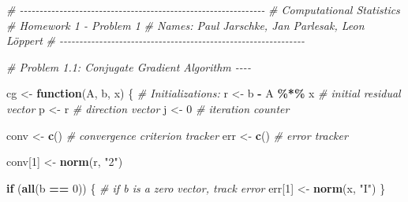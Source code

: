 \documentclass[
]{article}
\newenvironment{Shaded}{\begin{snugshade}}{\end{snugshade}}
\newcommand{\CommentTok}[1]{\textcolor[rgb]{0.56,0.35,0.01}{\textit{#1}}}
\newcommand{\ControlFlowTok}[1]{\textcolor[rgb]{0.13,0.29,0.53}{\textbf{#1}}}
\newcommand{\DecValTok}[1]{\textcolor[rgb]{0.00,0.00,0.81}{#1}}
\newcommand{\FunctionTok}[1]{\textcolor[rgb]{0.13,0.29,0.53}{\textbf{#1}}}
\newcommand{\NormalTok}[1]{#1}
\newcommand{\OtherTok}[1]{\textcolor[rgb]{0.56,0.35,0.01}{#1}}
\newcommand{\SpecialCharTok}[1]{\textcolor[rgb]{0.81,0.36,0.00}{\textbf{#1}}}
\newcommand{\StringTok}[1]{\textcolor[rgb]{0.31,0.60,0.02}{#1}}
\begin{document}
\begin{Shaded}
\begin{Highlighting}[]
\CommentTok{\# {-}{-}{-}{-}{-}{-}{-}{-}{-}{-}{-}{-}{-}{-}{-}{-}{-}{-}{-}{-}{-}{-}{-}{-}{-}{-}{-}{-}{-}{-}{-}{-}{-}{-}{-}{-}{-}{-}{-}{-}{-}{-}{-}{-}{-}{-}{-}{-}{-}{-}{-}{-}{-}{-}{-}{-}{-}{-}{-}{-}{-}{-}}
\CommentTok{\# Computational Statistics}
\CommentTok{\# Homework 1 {-} Problem 1}
\CommentTok{\# Names: Paul Jarschke, Jan Parlesak, Leon Löppert}
\CommentTok{\# {-}{-}{-}{-}{-}{-}{-}{-}{-}{-}{-}{-}{-}{-}{-}{-}{-}{-}{-}{-}{-}{-}{-}{-}{-}{-}{-}{-}{-}{-}{-}{-}{-}{-}{-}{-}{-}{-}{-}{-}{-}{-}{-}{-}{-}{-}{-}{-}{-}{-}{-}{-}{-}{-}{-}{-}{-}{-}{-}{-}{-}{-}}


\CommentTok{\# Problem 1.1: Conjugate Gradient Algorithm {-}{-}{-}{-}}

\NormalTok{cg }\OtherTok{\textless{}{-}} \ControlFlowTok{function}\NormalTok{(A, b, x) \{}
  \CommentTok{\# Initializations:}
\NormalTok{  r }\OtherTok{\textless{}{-}}\NormalTok{ b }\SpecialCharTok{{-}}\NormalTok{ A }\SpecialCharTok{\%*\%}\NormalTok{ x  }\CommentTok{\# initial residual vector}
\NormalTok{  p }\OtherTok{\textless{}{-}}\NormalTok{ r  }\CommentTok{\# direction vector}
\NormalTok{  j }\OtherTok{\textless{}{-}} \DecValTok{0}  \CommentTok{\# iteration counter}
  
\NormalTok{  conv }\OtherTok{\textless{}{-}} \FunctionTok{c}\NormalTok{()  }\CommentTok{\# convergence criterion tracker}
\NormalTok{  err }\OtherTok{\textless{}{-}} \FunctionTok{c}\NormalTok{()  }\CommentTok{\# error tracker}
  
\NormalTok{  conv[}\DecValTok{1}\NormalTok{] }\OtherTok{\textless{}{-}} \FunctionTok{norm}\NormalTok{(r, }\StringTok{"2"}\NormalTok{)}
  
  \ControlFlowTok{if}\NormalTok{ (}\FunctionTok{all}\NormalTok{(b }\SpecialCharTok{==} \DecValTok{0}\NormalTok{)) \{}
    \CommentTok{\# if b is a zero vector, track error}
\NormalTok{    err[}\DecValTok{1}\NormalTok{] }\OtherTok{\textless{}{-}} \FunctionTok{norm}\NormalTok{(x, }\StringTok{"I"}\NormalTok{)}
\NormalTok{  \}}
  

\end{Highlighting}
\end{Shaded}
\end{document}
